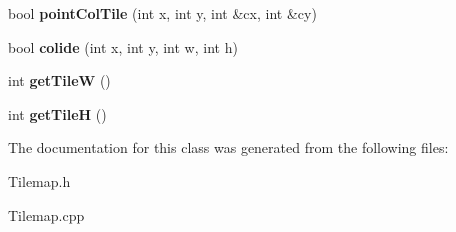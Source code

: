 \begin{DoxyCompactItemize}
\item 
\hypertarget{class_edda_1_1_tilemap_a266f422a080bd77925db78c67298e1c8}{
bool {\bfseries pointColTile} (int x, int y, int \&cx, int \&cy)}
\label{class_edda_1_1_tilemap_a266f422a080bd77925db78c67298e1c8}

\item 
\hypertarget{class_edda_1_1_tilemap_a505e0156b76397fb948bac0062be0f7b}{
bool {\bfseries colide} (int x, int y, int w, int h)}
\label{class_edda_1_1_tilemap_a505e0156b76397fb948bac0062be0f7b}

\item 
\hypertarget{class_edda_1_1_tilemap_a56abd23dedcb11aa634a33502faf7e02}{
int {\bfseries getTileW} ()}
\label{class_edda_1_1_tilemap_a56abd23dedcb11aa634a33502faf7e02}

\item 
\hypertarget{class_edda_1_1_tilemap_a9d2e45237be01d8a42eb73bde7f5e040}{
int {\bfseries getTileH} ()}
\label{class_edda_1_1_tilemap_a9d2e45237be01d8a42eb73bde7f5e040}

\end{DoxyCompactItemize}


The documentation for this class was generated from the following files:\begin{DoxyCompactItemize}
\item 
Tilemap.h\item 
Tilemap.cpp\end{DoxyCompactItemize}
